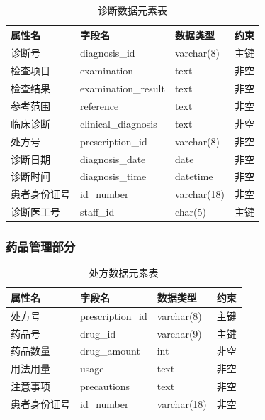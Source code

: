 \documentclass{article}
\begin{document}
\begin{table}[H]
    \centering
    \begin{tabularx}{\textwidth}{|>{\raggedright\arraybackslash}X|>{\raggedright\arraybackslash}X|>{\raggedright\arraybackslash}X|>{\raggedright\arraybackslash}X|}
    \toprule
    \textbf{属性名} & \textbf{字段名} & \textbf{数据类型} & \textbf{约束} \\ \midrule
    诊断号 & diagnosis\_id & varchar(8) & 主键 \\ \midrule
    检查项目 & examination & text & 非空 \\ \midrule
    检查结果 & examination\_result & text & 非空 \\ \midrule
    参考范围 & reference & text & 非空 \\ \midrule
    临床诊断 & clinical\_diagnosis & text & 非空 \\ \midrule
    处方号 & prescription\_id & varchar(8) & 非空 \\ \midrule
    诊断日期 & diagnosis\_date & date & 非空 \\ \midrule
    诊断时间 & diagnosis\_time & datetime & 非空 \\ \midrule
    患者身份证号 & id\_number & varchar(18) & 非空 \\ \midrule
    诊断医工号 & staff\_id & char(5) & 主键 \\ \bottomrule
    \end{tabularx}
    \caption{诊断数据元素表}
    \label{tab:diagnosis_elements}
\end{table}

\subsubsection{药品管理部分}

\begin{table}[H]
    \centering
    \begin{tabularx}{\textwidth}{|>{\raggedright\arraybackslash}X|>{\raggedright\arraybackslash}X|>{\raggedright\arraybackslash}X|>{\raggedright\arraybackslash}X|}
    \toprule
    \textbf{属性名} & \textbf{字段名} & \textbf{数据类型} & \textbf{约束} \\ \midrule
    处方号 & prescription\_id & varchar(8) & 主键 \\ \midrule
    药品号 & drug\_id & varchar(9) & 主键 \\ \midrule
    药品数量 & drug\_amount & int & 非空 \\ \midrule
    用法用量 & usage & text & 非空 \\ \midrule
    注意事项 & precautions & text & 非空 \\ \midrule
    患者身份证号 & id\_number & varchar(18) & 非空 \\ \midrule
    \end{tabularx}
    \caption{处方数据元素表}
    \label{tab:prescription_elements}
\end{table}
\end{document}

